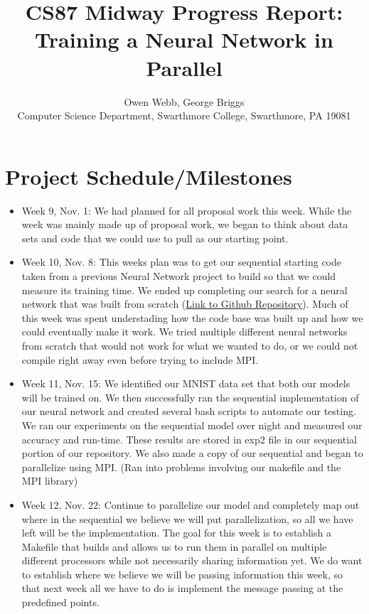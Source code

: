 \documentclass[11pt]{article}
\begin{document}
\title{CS87 Midway Progress Report: Training a Neural Network in Parallel}

\author{Owen Webb, George Briggs \\
Computer Science Department, Swarthmore College, Swarthmore, PA  19081}

\maketitle

\section{Project Schedule/Milestones}


\begin{itemize}
  \item Week 9, Nov. 1: We had planned for all proposal work this week. While the week was mainly made up of proposal work, we began to think about data sets and code that we could use to pull as our starting point.
\item Week 10, Nov. 8: This weeks plan was to get our sequential starting code taken from a previous Neural Network project to build so that we could measure its training time. We ended up completing our search for a neural network that was built from scratch (\href{https://github.com/tharrington923/neuralnet_handwritten_digit_recognition}{Link to Github Repository}). Much of this week was spent understading how the code base was built up and how we could eventually make it work. We tried multiple different neural networks from scratch that would not work for what we wanted to do, or we could not compile right away even before trying to include MPI.
\item Week 11, Nov. 15: We identified our MNIST data set that both our models will be trained on. We then successfully ran the sequential implementation of our neural network and created several bash scripts to automate our testing. We ran our experiments on the sequential model over night and measured our accuracy and run-time. These results are stored in exp2 file in our sequential portion of our repository. We also made a copy of our sequential and began to parallelize using MPI. (Ran into problems involving our makefile and the MPI library) 
\item Week 12, Nov. 22: Continue to parallelize our model and completely map out where in the sequential we believe we will put parallelization, so all we have left will be the implementation. The goal for this week is to establish a Makefile that builds and allows us to run them in parallel on multiple different processors while not necessarily sharing information yet. We do want to establish where we believe we will be passing information this week, so that next week all we have to do is implement the message passing at the predefined points. 

\end{itemize}
\end{document}
